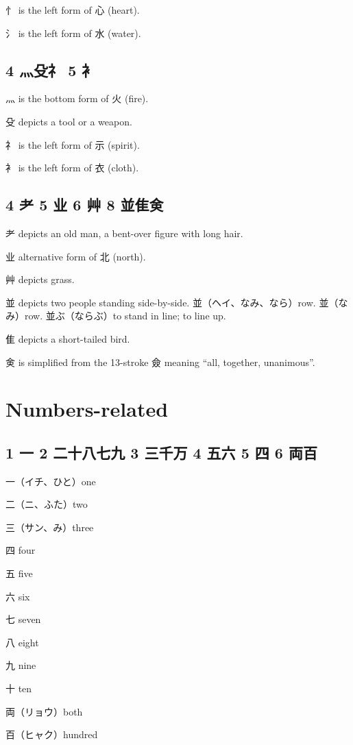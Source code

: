 忄 is the left form of 心 (heart).

氵 is the left form of 水 (water).

\subsection{4 灬殳礻 5 衤}

灬 is the bottom form of 火 (fire).

殳 depicts a tool or a weapon.

礻 is the left form of 示 (spirit).

衤 is the left form of 衣 (cloth).

\subsection{4 耂 5 业 6 艸 8 並隹㑒}

耂 depicts an old man, a bent-over figure with long hair.

业 alternative form of 北 (north).

艸 depicts grass.

並 depicts two people standing side-by-side.
並（ヘイ、なみ、なら）row.
並（なみ）row.
並ぶ（ならぶ）to stand in line; to line up.

隹 depicts a short-tailed bird.

㑒 is simplified from the 13-stroke 僉
meaning ``all, together, unanimous''.

\section{Numbers-related}

\subsection{1 一 2 二十八七九 3 三千万 4 五六 5 四 6 両百}

一（イチ、ひと）one

二（ニ、ふた）two

三（サン、み）three

四 four

五 five

六 six

七 seven

八 eight

九 nine

十 ten

両（リョウ）both

百（ヒャク）hundred

